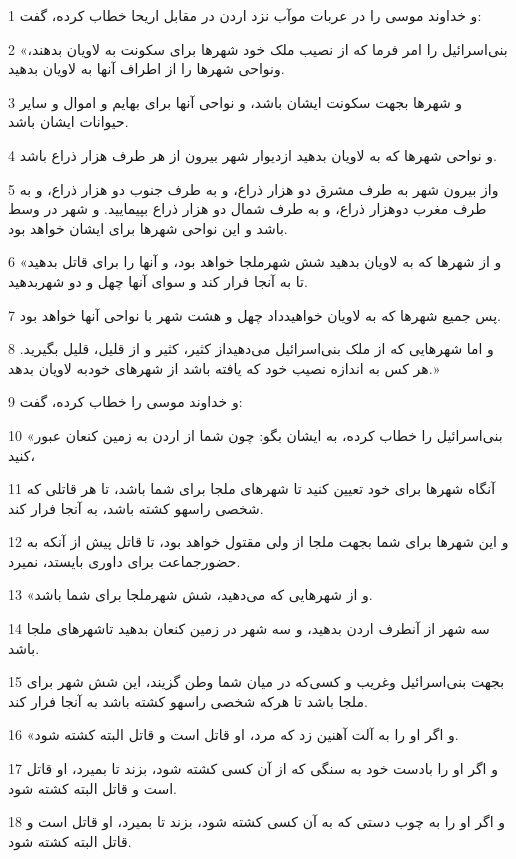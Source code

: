 \par 1 و خداوند موسی را در عربات موآب نزد اردن در مقابل اریحا خطاب کرده، گفت:
\par 2 «بنی‌اسرائیل را امر فرما که از نصیب ملک خود شهرها برای سکونت به لاویان بدهند، ونواحی شهرها را از اطراف آنها به لاویان بدهید.
\par 3 و شهرها بجهت سکونت ایشان باشد، و نواحی آنها برای بهایم و اموال و سایر حیوانات ایشان باشد.
\par 4 و نواحی شهرها که به لاویان بدهید ازدیوار شهر بیرون از هر طرف هزار ذراع باشد.
\par 5 واز بیرون شهر به طرف مشرق دو هزار ذراع، و به طرف جنوب دو هزار ذراع، و به طرف مغرب دوهزار ذراع، و به طرف شمال دو هزار ذراع بپیمایید. و شهر در وسط باشد و این نواحی شهرها برای ایشان خواهد بود.
\par 6 «و از شهرها که به لاویان بدهید شش شهرملجا خواهد بود، و آنها را برای قاتل بدهید تا به آنجا فرار کند و سوای آنها چهل و دو شهربدهید.
\par 7 پس جمیع شهرها که به لاویان خواهیدداد چهل و هشت شهر با نواحی آنها خواهد بود.
\par 8 و اما شهرهایی که از ملک بنی‌اسرائیل می‌دهیداز کثیر، کثیر و از قلیل، قلیل بگیرید. هر کس به اندازه نصیب خود که یافته باشد از شهرهای خودبه لاویان بدهد.»
\par 9 و خداوند موسی را خطاب کرده، گفت:
\par 10 «بنی‌اسرائیل را خطاب کرده، به ایشان بگو: چون شما از اردن به زمین کنعان عبور کنید،
\par 11 آنگاه شهرها برای خود تعیین کنید تا شهرهای ملجا برای شما باشد، تا هر قاتلی که شخصی راسهو کشته باشد، به آنجا فرار کند.
\par 12 و این شهرها برای شما بجهت ملجا از ولی مقتول خواهد بود، تا قاتل پیش از آنکه به حضورجماعت برای داوری بایستد، نمیرد.
\par 13 «و از شهرهایی که می‌دهید، شش شهرملجا برای شما باشد.
\par 14 سه شهر از آنطرف اردن بدهید، و سه شهر در زمین کنعان بدهید تاشهرهای ملجا باشد.
\par 15 بجهت بنی‌اسرائیل وغریب و کسی‌که در میان شما وطن گزیند، این شش شهر برای ملجا باشد تا هر‌که شخصی راسهو کشته باشد به آنجا فرار کند.
\par 16 «و اگر او را به آلت آهنین زد که مرد، او قاتل است و قاتل البته کشته شود.
\par 17 و اگر او را بادست خود به سنگی که از آن کسی کشته شود، بزند تا بمیرد، او قاتل است و قاتل البته کشته شود.
\par 18 و اگر او را به چوب دستی که به آن کسی کشته شود، بزند تا بمیرد، او قاتل است و قاتل البته کشته شود.
